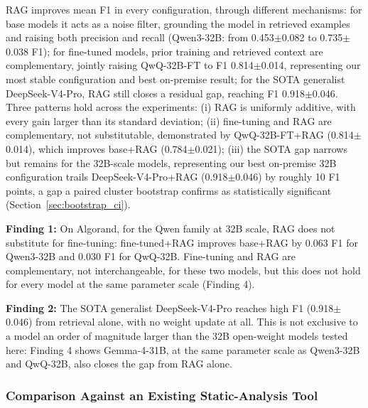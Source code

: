 \documentclass[lettersize,journal]{IEEEtran}
\newcommand{\finding}[2]{\par\noindent\colorbox{gray!12}{\parbox{0.965\linewidth}{\vspace{0.15cm}\textbf{Finding
#1:} #2\vspace{0.15cm}}}\par\vspace{0.25cm}}
\begin{document}
RAG improves mean F1 in every configuration, through different mechanisms: for base models it
acts as a noise filter, grounding the model in retrieved examples and raising both precision and
recall (Qwen3-32B: from 0.453$\pm$0.082 to 0.735$\pm$0.038 F1); for fine-tuned models,
prior training and retrieved context are complementary, jointly raising QwQ-32B-FT to F1
0.814$\pm$0.014, representing our most stable configuration and best on-premise result; for the SOTA
generalist DeepSeek-V4-Pro, RAG still closes a residual gap, reaching F1 0.918$\pm$0.046.
Three patterns hold across the experiments: (i) RAG is uniformly additive, with every gain larger than its
standard deviation; (ii) fine-tuning and RAG are complementary, not substitutable, demonstrated by QwQ-32B-FT+RAG
(0.814$\pm$0.014), which improves base+RAG (0.784$\pm$0.021); (iii) the SOTA gap narrows but remains for
the 32B-scale models, representing our best on-premise 32B configuration trails DeepSeek-V4-Pro+RAG
(0.918$\pm$0.046) by roughly 10 F1 points, a gap a paired cluster bootstrap confirms as
statistically significant (Section~\ref{sec:bootstrap_ci}).

\finding{1}{On Algorand, for the Qwen family at 32B scale, RAG does not substitute for fine-tuning:
fine-tuned+RAG improves base+RAG by 0.063 F1 for Qwen3-32B and 0.030 F1 for QwQ-32B. Fine-tuning
and RAG are complementary, not interchangeable, for these two models, but this does not hold for
every model at the same parameter scale (Finding 4).}

\finding{2}{The SOTA generalist DeepSeek-V4-Pro reaches high F1 (0.918$\pm$0.046) from retrieval
alone, with no weight update at all. This is not exclusive to a model an order of magnitude larger
than the 32B open-weight models tested here: Finding 4 shows Gemma-4-31B, at the same parameter
scale as Qwen3-32B and QwQ-32B, also closes the gap from RAG alone.}

\subsubsection{Comparison Against an Existing Static-Analysis Tool}
\label{sec:static_tool_comparison_algorand}
\end{document}
